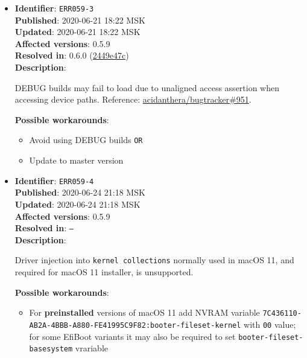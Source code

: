 \documentclass[]{article}
\providecommand{\tightlist}{%
  \setlength{\itemsep}{0pt}\setlength{\parskip}{0pt}}
\begin{document}
\begin{itemize}
\item
  \textbf{Identifier}: \texttt{ERR059-3} \\
  \textbf{Published}: 2020-06-21 18:22 MSK \\
  \textbf{Updated}: 2020-06-21 18:22 MSK \\
  \textbf{Affected versions}: 0.5.9 \\
  \textbf{Resolved in}: 0.6.0 (\href{https://github.com/acidanthera/OpenCorePkg/commit/2449e47cb2d110a288d491beee0b5b168d2bb480}{2449e47c}) \\
  \textbf{Description}:

  DEBUG builds may fail to load due to unaligned access assertion when accessing device paths.
  Reference: \href{https://github.com/acidanthera/bugtracker/issues/951}{acidanthera/bugtracker\#951}.

  \textbf{Possible workarounds}:
  \begin{itemize}
    \tightlist
    \item Avoid using DEBUG builds \texttt{OR}
    \item Update to master version
  \end{itemize}


\item
  \textbf{Identifier}: \texttt{ERR059-4} \\
  \textbf{Published}: 2020-06-24 21:18 MSK \\
  \textbf{Updated}: 2020-06-24 21:18 MSK \\
  \textbf{Affected versions}: 0.5.9 \\
  \textbf{Resolved in}: \texttt{--} \\
  \textbf{Description}:

  Driver injection into \texttt{kernel collections} normally used in macOS 11,
  and required for macOS 11 installer, is unsupported.

  \textbf{Possible workarounds}:
  \begin{itemize}
    \tightlist
    \item For \textbf{preinstalled} versions of macOS 11 add NVRAM variable
    \texttt{7C436110-AB2A-4BBB-A880-FE41995C9F82:booter-fileset-kernel}
    with \texttt{00} value; for some EfiBoot variants it may also be
    required to set \texttt{booter-fileset-basesystem} vrariable
  \end{itemize}


\end{itemize}
\end{document}
